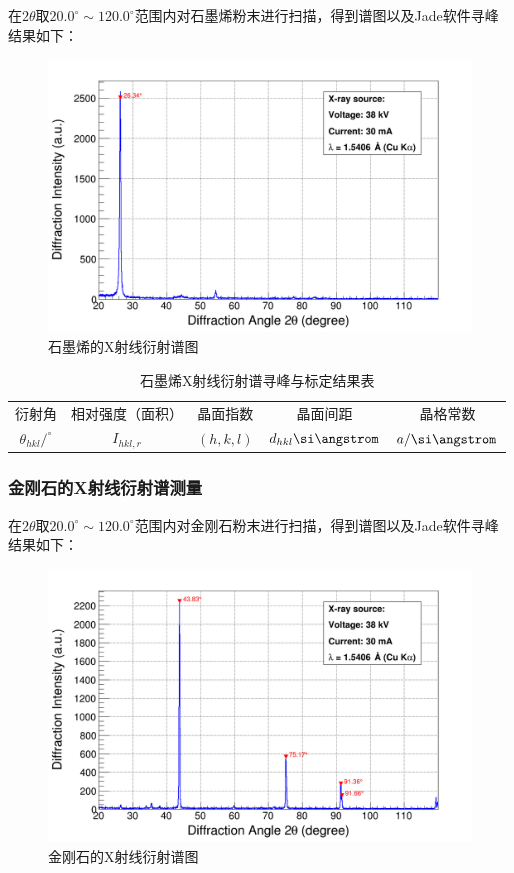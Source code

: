 \documentclass{thuemp}
\begin{document}
在$2\theta$取$20.0^\circ \sim 120.0^\circ$范围内对石墨烯粉末进行扫描，得到谱图以及Jade软件寻峰结果如下： 

\begin{figure}[H]
    \centering
    \includegraphics[width=0.8\linewidth]{../Data/C-Graphene-multi.png}
    \caption{石墨烯的X射线衍射谱图}
    \label{fig:graphene_xrd}
\end{figure}

\begin{table}
    \centering
    \captionnamefont{\wuhao\bf\heiti}
    \captiontitlefont{\wuhao\bf\heiti}
    \caption{石墨烯X射线衍射谱寻峰与标定结果表}
    \label{tab:graphene_xrd}
    \liuhao
    \begin{tabular}{ccccc}
        \toprule
        衍射角 & 相对强度（面积）& 晶面指数 & 晶面间距 & 晶格常数 \\
        $\theta_{hkl}/^\circ$ & $I_{hkl,r}$ & $(h,k,l)$ & $d_{hkl}\text{\si\angstrom}$ & $a/\text{\si\angstrom}$\\
        \midrule
        \bottomrule
    \end{tabular}
\end{table}



\subsubsection{金刚石的X射线衍射谱测量}

在$2\theta$取$20.0^\circ \sim 120.0^\circ$范围内对金刚石粉末进行扫描，得到谱图以及Jade软件寻峰结果如下：

\begin{figure}[H]
    \centering
    \includegraphics[width=0.8\linewidth]{../Data/C-Diamond-multi.png}
    \caption{金刚石的X射线衍射谱图}
    \label{fig:diamond_xrd}
\end{figure}
\end{document}
